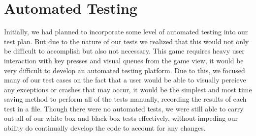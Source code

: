 \documentclass[12pt, titlepage]{article}
\begin{document}
\section{Automated Testing}

Initially, we had planned to incorporate some level of automated testing into our test plan. But due to the nature of our tests we realized that this would not only be difficult to accomplish but also not necessary. This game requires heavy user interaction with key presses and visual queues from the game view, it would be very difficult to develop an automated testing platform. Due to this, we focused many of our test cases on the fact that a user would be able to visually percieve any exceptions or crashes that may occur, it would be the simplest and most time saving method to perform all of the tests manually, recording the results of each test in a file. Though there were no automated tests, we were still able to carry out all of our white box and black box tests effectively, without impeding our ability do continually develop the code to account for any changes.
		
\end{document}
